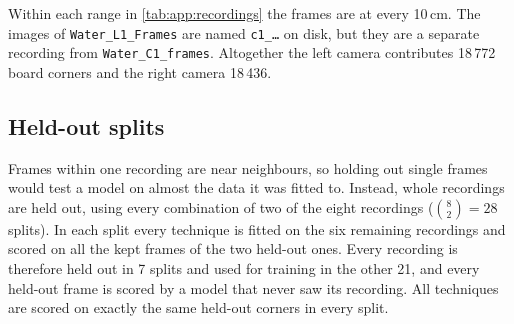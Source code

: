Within each range in \autoref{tab:app:recordings} the frames are at every 10\,cm. The images of
\texttt{Water\_L1\_Frames} are named \texttt{c1\_\ldots} on disk, but they are a separate recording from
\texttt{Water\_C1\_frames}. Altogether the left camera contributes 18\,772 board corners and the right camera
18\,436.

\subsection*{Held-out splits}
\label{app:heldout:splits}

Frames within one recording are near neighbours, so holding out single frames would test a model on almost the
data it was fitted to. Instead, whole recordings are held out, using every combination of two of the eight
recordings ($\binom{8}{2} = 28$ splits). In each split every technique is fitted on the six remaining recordings
and scored on all the kept frames of the two held-out ones. Every recording is therefore held out in 7 splits and
used for training in the other 21, and every held-out frame is scored by a model that never saw its recording.
All techniques are scored on exactly the same held-out corners in every split.

